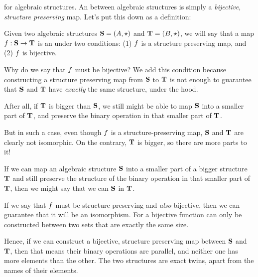 \documentclass[../../../main.tex]{subfiles}
\begin{document}
 for algebraic structures. An  between algebraic structures is simply a \emph{bijective}, \emph{structure preserving} map. Let's put this down as a definition:

\begin{fdefinition}
  \label{def:algebraic-isomorphism}
  Given two algebraic structures $\algebra{S} = (\set{A}, \opSymbol/)$ and $\algebra{T} = (\set{B}, \opSymbol/)$, we will say that a map $f: \mathbf{S} \rightarrow \mathbf{T}$ is an  under two conditions: (1) $f$ is a structure preserving map, and (2) $f$ is bijective.
\end{fdefinition}

Why do we say that $f$ must be bijective? We add this condition because constructing a structure preserving map from $\mathbf{S}$ to $\mathbf{T}$ is not enough to guarantee that $\mathbf{S}$ and $\mathbf{T}$ have \emph{exactly} the same structure, under the hood. 

After all, if $\mathbf{T}$ is bigger than $\mathbf{S}$, we still might be able to map $\mathbf{S}$ into a smaller part of $\mathbf{T}$, and preserve the binary operation in that smaller part of $\mathbf{T}$.

But in such a case, even though $f$ is a structure-preserving map, $\mathbf{S}$ and $\mathbf{T}$ are clearly not isomorphic. On the contrary, $\mathbf{T}$ is bigger, so there are more parts to it! 

\begin{terminology}
  If we can map an algebraic structure $\mathbf{S}$ into a smaller part of a bigger structure $\mathbf{T}$ and still preserve the structure of the binary operation in that smaller part of $\mathbf{T}$, then we might say that we can  $\mathbf{S}$ in $\mathbf{T}$.
\end{terminology}

If we say that $f$ must be structure preserving and \emph{also} bijective, then we can guarantee that it will be an isomorphism. For a bijective function can only be constructed between two sets that are exactly the same size. 

Hence, if we can construct a bijective, structure preserving map between $\mathbf{S}$ and $\mathbf{T}$, then that means their binary operations are parallel, and neither one has more elements than the other. The two structures are exact twins, apart from the names of their elements.
\end{document}
